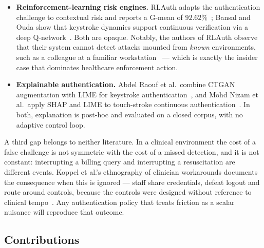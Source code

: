\documentclass[conference]{IEEEtran}
\begin{document}
\begin{itemize}
\item \textbf{Reinforcement-learning risk engines.} RLAuth adapts the
authentication challenge to contextual risk and reports a G-mean of
$92.62\%$~\cite{rlauth}; Bansal and Ouda show that keystroke dynamics support
continuous verification via a deep Q-network~\cite{bansal2024}. Both are
opaque. Notably, the authors of RLAuth observe that their system cannot detect
attacks mounted from \emph{known} environments, such as a colleague at a
familiar workstation~\cite{rlauth} --- which is exactly the insider case that
dominates healthcare enforcement action.
\item \textbf{Explainable authentication.} Abdel Raouf et al.\ combine CTGAN
augmentation with LIME for keystroke authentication~\cite{raouf2024}, and Mohd
Nizam et al.\ apply SHAP and LIME to touch-stroke continuous
authentication~\cite{nizam2026}. In both, explanation is post-hoc and evaluated
on a closed corpus, with no adaptive control loop.
\end{itemize}

A third gap belongs to neither literature. In a clinical environment the cost
of a false challenge is not symmetric with the cost of a missed detection, and
it is not constant: interrupting a billing query and interrupting a
resuscitation are different events. Koppel et al.'s ethnography of clinician
workarounds documents the consequence when this is ignored --- staff share
credentials, defeat logout and route around controls, because the controls were
designed without reference to clinical tempo~\cite{koppel2015}. Any
authentication policy that treats friction as a scalar nuisance will reproduce
that outcome.

\subsection{Contributions}
\end{document}
